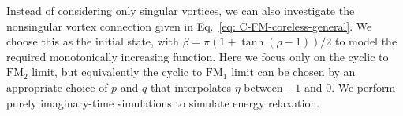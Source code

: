 Instead of considering only singular vortices, we can also investigate the
nonsingular vortex connection given in Eq.~\eqref{eq: C-FM-coreless-general}.
We choose this as the initial state, with
\(\beta = \pi\left(1 + \tanh(\rho-1)\right)/2\) to model the required
monotonically increasing function.
Here we focus only on the cyclic to \(\text{FM}_2\) limit, but equivalently the
cyclic to \(\text{FM}_1\) limit can be chosen by an appropriate choice of \(p\)
and \(q\) that interpolates \(\eta \) between \(-1\) and \(0\).
We perform purely imaginary-time simulations to simulate energy relaxation.
\begin{figure}
    \centering
\end{figure}
